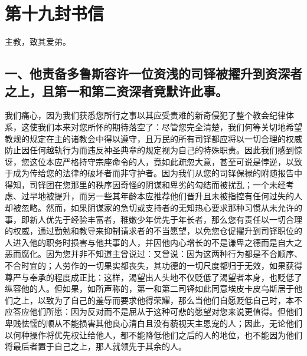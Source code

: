 

\section{第十九封书信}

主教，致其爱弟。\par


\subsection{一、他责备多鲁斯容许一位资浅的司铎被擢升到资深者之上，且第一和第二资深者竟默许此事。}

我们痛心，因为我们获悉您所行之事以其应受责难的新奇侵犯了整个教会纪律体系，这使我们本来对您所怀的期待落空了：尽管您完全清楚，我们何等关切地希望教规的规定在主的诸教会中得以遵守，且万民的所有司铎都应将以一切合理的权威防止因任何越轨行为而违反神圣典章的规定视为自己的特殊职责。因此我们感到惊讶，您这位本应严格持守宗座命令的人，竟如此疏忽大意，甚至可说是悖逆，以致于成为传给您的法律的破坏者而非守护者。因为我们从您的司铎保禄的附随报告中得知，司铎团在您那里的秩序因奇怪的阴谋和卑劣的勾结而被扰乱；一个未经考虑、过早地被提升，而另一些其年龄本应推荐他们晋升且未被指控有任何过失的人却被忽略。然而，如果阴谋家的急切或支持者的无知热心要求那种习惯从未允许的事，即新人优先于经验丰富者，稚嫩少年优先于年长者，那么您有责任以一切合理的权威，通过勤勉和教导来抑制请求者的不当愿望，以免您仓促擢升到司铎职位的人进入他的职务时损害与他共事的人，并因他内心增长的不是谦卑之德而是自大之恶而腐化。因为您并非不知道主曾说过：又曾说：因为这两种行为都是不合顺序、不合时宜的；人劳作的一切果实都丧失，其功德的一切尺度都归于无效，如果获得尊严与奉承的程度成正比：这样，渴望出人头地不仅贬低了渴望者本身，也贬低了纵容他的人。但如果，如所声称的，第一和第二司铎如此同意埃皮卡皮乌斯居于他们之上，以致为了自己的羞辱而要求他得荣耀，那么当他们自愿贬低自己时，本不应答应他们所愿：因为反对而不是屈从于这种可悲的愿望对您来说更值得。但他们卑贱怯懦的顺从不能损害其他良心清白且没有藐视天主恩宠的人；因此，无论他们以何种操作将优先权让给他人，都不能降低他们之后的人的地位，也不能因为他们将最后者置于自己之上，那人就领先于其余的人。\par

